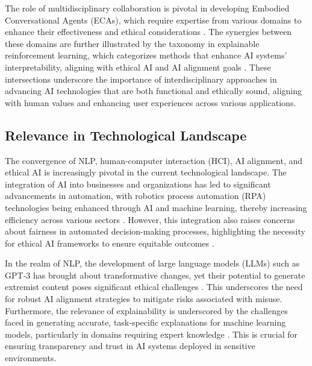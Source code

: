 The role of multidisciplinary collaboration is pivotal in developing Embodied Conversational Agents (ECAs), which require expertise from various domains to enhance their effectiveness and ethical considerations \cite{korre2023takesvillagemultidisciplinaritycollaboration}. The synergies between these domains are further illustrated by the taxonomy in explainable reinforcement learning, which categorizes methods that enhance AI systems' interpretability, aligning with ethical AI and AI alignment goals \cite{chitale2023taskarithmeticloracontinual}. These intersections underscore the importance of interdisciplinary approaches in advancing AI technologies that are both functional and ethically sound, aligning with human values and enhancing user experiences across various applications.





\subsection{Relevance in Technological Landscape} \label{subsec:Relevance in Technological Landscape}

The convergence of NLP, human-computer interaction (HCI), AI alignment, and ethical AI is increasingly pivotal in the current technological landscape. The integration of AI into businesses and organizations has led to significant advancements in automation, with robotics process automation (RPA) technologies being enhanced through AI and machine learning, thereby increasing efficiency across various sectors \cite{pandy2024advancementsroboticsprocessautomation}. However, this integration also raises concerns about fairness in automated decision-making processes, highlighting the necessity for ethical AI frameworks to ensure equitable outcomes \cite{narayanan2023democratizecareneedfairness}.



In the realm of NLP, the development of large language models (LLMs) such as GPT-3 has brought about transformative changes, yet their potential to generate extremist content poses significant ethical challenges \cite{mcguffie2020radicalizationrisksgpt3advanced}. This underscores the need for robust AI alignment strategies to mitigate risks associated with misuse. Furthermore, the relevance of explainability is underscored by the challenges faced in generating accurate, task-specific explanations for machine learning models, particularly in domains requiring expert knowledge \cite{chiaburu2024copronnconceptbasedprototypicalnearest}. This is crucial for ensuring transparency and trust in AI systems deployed in sensitive environments.



